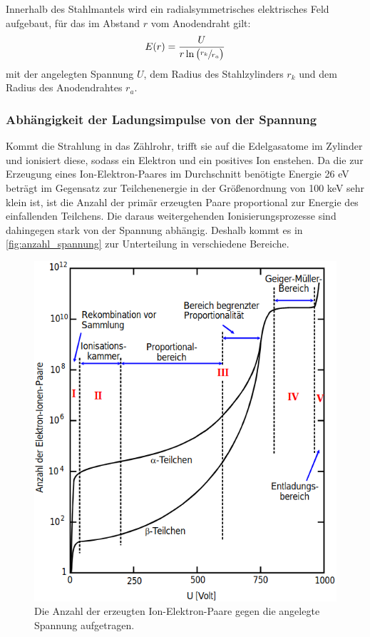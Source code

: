 \documentclass[titlepage = firstcover]{scrartcl}
\begin{document}
          Innerhalb des Stahlmantels wird ein radialsymmetrisches elektrisches Feld aufgebaut, für das im Abstand $r$ vom Anodendraht gilt:
          \begin{equation}
              E(r) = \frac{U}{r \ln{\bigl(\sfrac{r_k}{r_a}}\bigr)}
              \label{eqn:feldstaerke}
          \end{equation}
          mit der angelegten Spannung $U$, dem Radius des Stahlzylinders $r_k$ und dem Radius des Anodendrahtes $r_a$.

        \subsubsection{Abhängigkeit der Ladungsimpulse von der Spannung}
          Kommt die Strahlung in das Zählrohr, trifft sie auf die Edelgasatome im Zylinder und ionisiert diese, sodass ein Elektron und ein positives Ion enstehen. Da die zur Erzeugung eines Ion-Elektron-Paares im Durchschnitt benötigte Energie 26 eV beträgt im Gegensatz zur Teilchenenergie in der Größenordnung von 100 keV sehr klein ist, ist die Anzahl der primär erzeugten Paare proportional zur Energie des einfallenden Teilchens. Die daraus weitergehenden Ionisierungsprozesse sind dahingegen stark von der Spannung abhängig. Deshalb kommt es in \autoref{fig:anzahl_spannung} zur Unterteilung in verschiedene Bereiche.
          \begin{figure}[h]
            \centering
            \includegraphics[width = 0.7\linewidth]{anzahl_spannung.png}
            \caption{Die Anzahl der erzeugten Ion-Elektron-Paare gegen die angelegte Spannung aufgetragen.}
            \label{fig:anzahl_spannung}
          \end{figure}
          \FloatBarrier
\end{document}
